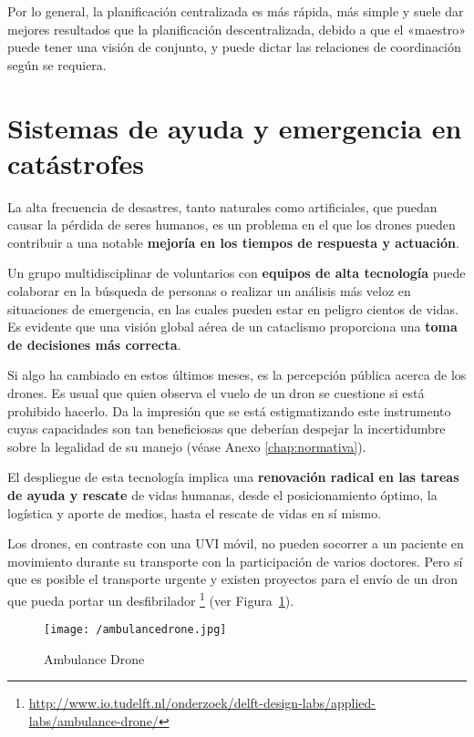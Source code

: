 Por lo general, la planificación centralizada es más rápida, más simple y suele dar mejores resultados que la planificación descentralizada, debido a que el «maestro» puede tener una visión de conjunto, y puede dictar las relaciones de coordinación según se requiera. 	

\section{Sistemas de ayuda y emergencia en catástrofes}
\label{sec:sistemas}

La alta frecuencia de desastres, tanto naturales como artificiales, que puedan causar la pérdida de seres humanos, es un problema en el que los drones pueden contribuir a una notable \textbf{mejoría en los tiempos de respuesta y actuación}.

Un grupo multidisciplinar de voluntarios con \textbf{equipos de alta tecnología} puede colaborar en la búsqueda de personas o realizar un análisis más veloz en situaciones de emergencia, en las cuales pueden estar en peligro cientos de vidas. Es evidente que una visión global aérea de un cataclismo proporciona una \textbf{toma de decisiones más correcta}.

Si algo ha cambiado en estos últimos meses, es la percepción pública acerca de los drones. Es usual que quien observa el vuelo de un dron se cuestione si está prohibido hacerlo. Da la impresión que se está estigmatizando este instrumento cuyas capacidades son tan beneficiosas que deberían despejar la incertidumbre sobre la legalidad de su manejo (véase Anexo \ref{chap:normativa}).

El despliegue de esta tecnología implica una \textbf{renovación radical en las tareas de ayuda y rescate} de vidas humanas, desde el posicionamiento óptimo, la logística y aporte de medios, hasta el rescate de vidas en sí mismo.

Los drones, en contraste con una UVI móvil, no pueden socorrer a un paciente en movimiento durante su transporte con la participación de varios doctores. Pero sí que es posible el transporte urgente y existen proyectos para el envío de un dron que pueda portar un desfibrilador \footnote{\url{http://www.io.tudelft.nl/onderzoek/delft-design-labs/applied-labs/ambulance-drone/}} (ver Figura~\ref{fig:ambulancedrone}).

\begin{figure}[!h]
\begin{center}
\texttt{[image: /ambulancedrone.jpg]}
\caption[Ambulance Drone]{Ambulance Drone}
\label{fig:ambulancedrone}
\end{center}
\end{figure}

